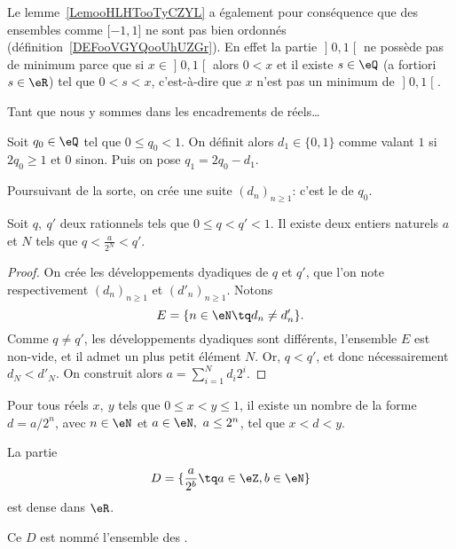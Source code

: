 \begin{remark}      \label{REMooXOIOooHjwMvA}
	Le lemme~\ref{LemooHLHTooTyCZYL} a également pour conséquence que des ensembles comme \( \mathopen[ -1 , 1 \mathclose]\) ne sont pas bien ordonnés (définition~\ref{DEFooVGYQooUhUZGr}). En effet la partie \( \mathopen] 0 , 1 \mathclose[\) ne possède pas de minimum parce que si \( x\in \mathopen] 0 , 1 \mathclose[\) alors \( 0<x\) et il existe \( s\in \eQ\) (a fortiori \( s\in \eR\)) tel que \( 0<s<x\), c'est-à-dire que \( x\) n'est pas un minimum de \( \mathopen] 0 , 1 \mathclose[\).
\end{remark}

Tant que nous y sommes dans les encadrements de réels\dots
\begin{normaltext}
	Soit \(q_0 \in \eQ \) tel que \( 0 \leq q_0 < 1 \). On définit alors \( d_1 \in \{0, 1\} \) comme valant \( 1 \) si \( 2 q_0 \geq 1 \) et \(0 \) sinon. Puis on pose \( q_1 = 2 q_0 - d_1 \).

	Poursuivant de la sorte, on crée une suite \( (d_n)_{n\geq 1} \): c'est le  de \( q_0 \).
\end{normaltext}

\begin{lemma}        \label{LEMooRSLIooVrZMxM}
	Soit \( q,\ q' \) deux rationnels tels que \( 0 \leq q < q' < 1 \). Il existe deux entiers naturels \( a \) et \( N \) tels que \( q < \frac a {2^N} < q' \).
\end{lemma}
\begin{proof}
	On crée les développements dyadiques de \( q \) et \( q' \), que l'on note respectivement \( (d_n)_{n\geq 1} \) et \( (d'_n)_{n\geq 1} \). Notons
	\begin{equation}
		E = \{ n \in \eN \tq d_n \neq d'_n \}.
	\end{equation}
	Comme \( q \neq q' \), les développements dyadiques sont différents, l'ensemble \(E\) est non-vide, et il admet un plus petit élément \(N \). Or, \( q < q' \), et donc nécessairement \( d_N < d'_N \). On construit alors \( a = \sum_{i=1}^{N} d_i 2^i \).
\end{proof}

\begin{corollary}    \label{CorDensiteDyadiques}
	Pour tous réels \(x,\ y\) tels que \( 0 \leq x < y \leq 1 \), il existe un nombre de la forme \( d = a / 2^n \), avec \( n \in \eN \) et \( a \in \eN,\ a \leq 2^n\), tel que \( x < d < y \).

    La partie
    \begin{equation}
        D=\{ \frac{ a }{ 2^b }\tq a\in \eZ,b\in \eN \}
    \end{equation}
    est dense dans \( \eR\).

    Ce \( D\) est nommé l'ensemble des .
\end{corollary}

